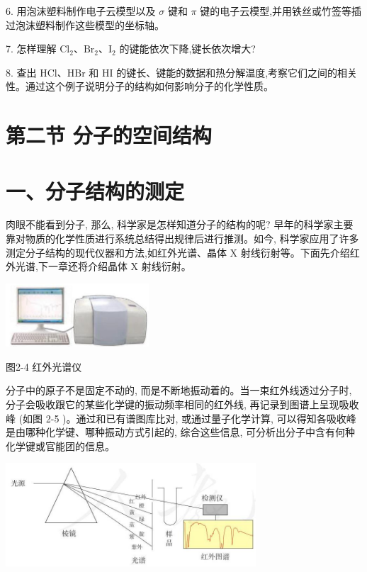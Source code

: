 \documentclass[10pt]{article}
\begin{document}
6. 用泡沫塑料制作电子云模型以及 \(\sigma\) 键和 \(\pi\) 键的电子云模型,并用铁丝或竹签等插过泡沫塑料制作这些模型的坐标轴。

7. 怎样理解 \({\mathrm{{Cl}}}_{2}\text{、}{\mathrm{{Br}}}_{2}\text{、}{\mathrm{I}}_{2}\) 的键能依次下降,键长依次增大?

8. 查出 \(\mathrm{{HCl}}\text{、}\mathrm{{HBr}}\) 和 \(\mathrm{{HI}}\) 的键长、键能的数据和热分解温度,考察它们之间的相关性。通过这个例子说明分子的结构如何影响分子的化学性质。

\section*{第二节 分子的空间结构}

\section*{一、分子结构的测定}

肉眼不能看到分子, 那么, 科学家是怎样知道分子的结构的呢? 早年的科学家主要靠对物质的化学性质进行系统总结得出规律后进行推测。如今, 科学家应用了许多测定分子结构的现代仪器和方法,如红外光谱、晶体 \(\mathrm{X}\) 射线衍射等。下面先介绍红外光谱,下一章还将介绍晶体 \(\mathrm{X}\) 射线衍射。

\begin{center}
\includegraphics[max width=0.4\textwidth]{images/0190e026-5a11-7df7-bd27-54d09026ba7a_44_518010.jpg}
\end{center}

图2-4 红外光谱仪

分子中的原子不是固定不动的, 而是不断地振动着的。当一束红外线透过分子时, 分子会吸收跟它的某些化学键的振动频率相同的红外线, 再记录到图谱上呈现吸收峰 (如图 2-5 )。通过和已有谱图库比对, 或通过量子化学计算, 可以得知各吸收峰是由哪种化学键、哪种振动方式引起的, 综合这些信息, 可分析出分子中含有何种化学键或官能团的信息。

\begin{center}
\includegraphics[max width=0.7\textwidth]{images/0190e026-5a11-7df7-bd27-54d09026ba7a_44_587402.jpg}
\end{center}
\end{document}

